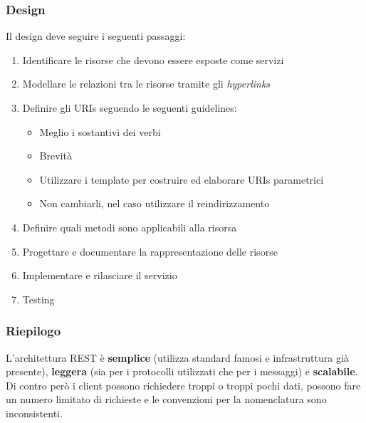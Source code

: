 \subsubsection{Design}
Il design deve seguire i seguenti passaggi:
\begin{enumerate}
	\item Identificare le risorse che devono essere esposte come servizi
	\item Modellare le relazioni tra le risorse tramite gli \textit{hyperlinks}
	\item Definire gli URIs seguendo le seguenti guidelines:
	\begin{itemize}
		\item Meglio i sostantivi dei verbi
		\item Brevità
		\item Utilizzare i template per costruire ed elaborare URIs parametrici
		\item Non cambiarli, nel caso utilizzare il reindirizzamento
	\end{itemize}
	\item Definire quali metodi sono applicabili alla risorsa
	\item Progettare e documentare la rappresentazione delle risorse
	\item Implementare e rilasciare il servizio
	\item Testing
\end{enumerate}
\subsubsection{Riepilogo}
L'architettura REST è \textbf{semplice} (utilizza standard famosi e infrastruttura già presente), \textbf{leggera} (sia per i protocolli utilizzati che per i messaggi) e \textbf{scalabile}. Di contro però i client possono richiedere troppi o troppi pochi dati, possono fare un numero limitato di richieste e le convenzioni per la nomenclatura sono inconsistenti.